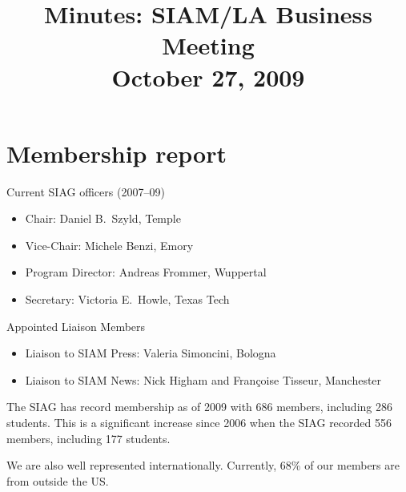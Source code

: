 \documentclass[]{article}
\title{Minutes: SIAM/LA Business Meeting \\ October 27, 2009}
\begin{document}
\maketitle







\section{Membership report}
Current SIAG officers (2007--09)
\begin{itemize}
\item Chair: Daniel B.\ Szyld, Temple 
\item Vice-Chair: Michele Benzi, Emory 
\item Program Director: Andreas Frommer, Wuppertal
\item Secretary: Victoria E.\ Howle, Texas Tech
\end{itemize}

\noindent
Appointed Liaison Members
\begin{itemize}
\item Liaison to SIAM Press: Valeria Simoncini, Bologna
\item Liaison to SIAM News: Nick Higham and Fran\c{c}oise Tisseur, Manchester
\end{itemize}

The SIAG has record membership as of 2009 with 686 members, including 286
students. This is a significant increase since 2006 when the SIAG recorded 556
members, including 177 students.

We are also well represented internationally. Currently, 68\% of our members
are from outside the US.  
\end{document}
